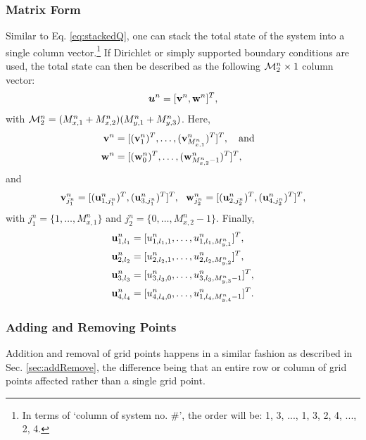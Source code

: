\documentclass[fleqn]{jaes}
\begin{document}
\subsubsection{Matrix Form}
Similar to Eq. \eqref{eq:stackedQ}, one can stack the total state of the system into a single column vector.\footnote{In terms of `column of system no. \#', the order will be: 1, 3, ..., 1, 3, 2, 4, ..., 2, 4.} If Dirichlet or simply supported boundary conditions are used, the total state can then be described as the following ${\mathcal{M}_2^n} \times 1$ column vector:
\begin{equation}\label{eq:stacked2D}
     \uStack^n = [\v^n, \w^n]^T,
\end{equation}
with ${\mathcal{M}_2^n} =(M_{x, 1}^n + M_{x, 2}^n) (M_{y, 1}^n + M_{y, 3}^n)$. Here,
\begin{equation}\label{eq:vw}
\begin{aligned}
    \v^n &= [(\v_{1}^n)^T,\hdots, (\v_{M_{x,1}^n}^n)^T]^T, \qaq\\
    \w^n &= [(\w_{0}^n)^T, \hdots, (\w_{M_{x, 2}^n-1}^n)^T]^T,
\end{aligned}
\end{equation}
and
\begin{equation*}
     \mathbf{v}_{j_1^n}^n = [(\mathbf{u}_{1, j_1^n}^n)^T, (\mathbf{u}_{3, j_1^n}^n)^T]^T, \ \ \mathbf{w}_{j_2^n}^n = [(\mathbf{u}_{2, j_2^n}^n)^T, (\mathbf{u}_{4, j_2^n}^n)^T]^T,
\end{equation*}
with $j_1^n = \{1, \hdots, M_{x,1}^n\}$ and $j_2^n = \{0, \hdots, M_{x,2}^n-1\}$. Finally, 
\begin{equation}\label{eq:2DuDefs}
    \begin{aligned}
         \u_{1,l_1}^n &= [u_{1, l_1, 1}^n, \hdots, u_{1, l_1, M_{y, 1}^n}^n]^T,
         \\
         \u_{2,l_2}^n &= [u_{2, l_2, 1}^n, \hdots, u_{2, l_2, M_{y, 2}^n}^n]^T,\\
         \u_{3,l_3}^n &= [u_{3, l_3, 0}^n, \hdots, u_{3, l_3, M_{y, 3}^n-1}^n]^T,\\
         \u_{4,l_4}^n &= [u_{4, l_4, 0}^n, \hdots, u_{1, l_4, M_{y, 4}^n-1}^n]^T.
     \end{aligned}
\end{equation}

\subsubsection{Adding and Removing Points}
Addition and removal of grid points happens in a similar fashion as described in Sec. \ref{sec:addRemove}, the difference being that an entire row or column of grid points affected rather than a single grid point.
\end{document}
